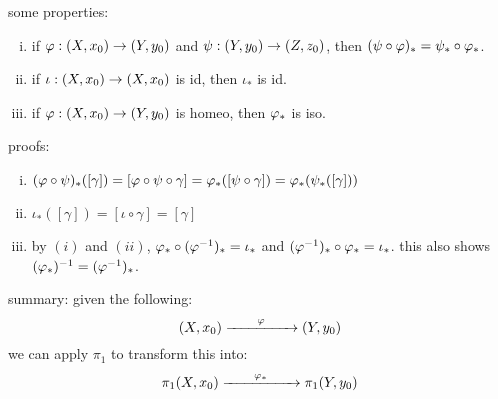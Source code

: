 some properties:
\begin{enumerate}[(i)]
    \item if $\varphi:(X,x_{0})\rightarrow(Y,y_{0})$ and $\psi:(Y,y_{0})\rightarrow(Z,z_{0})$,
        then $(\psi\circ\varphi)_{*}=\psi_{*}\circ\varphi_{*}$.
    \item if $\iota:(X,x_{0})\rightarrow(X,x_{0})$ is id, then $\iota_{*}$ is id.
    \item if $\varphi:(X,x_{0})\rightarrow(Y,y_{0})$ is homeo, then $\varphi_{*}$ is iso.
\end{enumerate}
proofs:
\begin{enumerate}[(i)]
    \item $(\varphi\circ\psi)_{*}([\gamma])=[\varphi\circ\psi\circ\gamma]
        =\varphi_{*}([\psi\circ\gamma])=\varphi_{*}(\psi_{*}([\gamma]))$
    \item $\iota_{*}([\gamma])=[\iota\circ\gamma]=[\gamma]$
    \item by $(i)$ and $(ii)$, $\varphi_{*}\circ(\varphi^{-1})_{*}=\iota_{*}$ and
        $(\varphi^{-1})_{*}\circ\varphi_{*}=\iota_{*}$.
        this also shows $(\varphi_{*})^{-1}=(\varphi^{-1})_{*}$.
\end{enumerate}

summary: given the following:
\begin{equation*}
    (X,x_{0}) \xrightarrow{\qquad \varphi \qquad} (Y,y_{0})
\end{equation*}
we can apply $\pi_{1}$ to transform this into:
\begin{equation*}
    \pi_{1}(X,x_{0}) \xrightarrow{\qquad \varphi_{*} \qquad} \pi_{1}(Y,y_{0})
\end{equation*}


